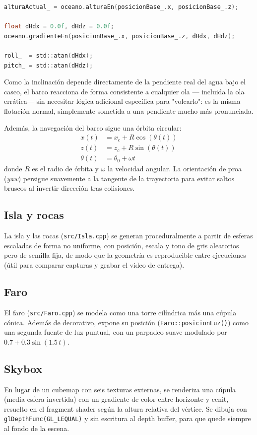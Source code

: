 \documentclass[11pt]{article}
\begin{document}
\begin{lstlisting}[language=C,caption={Barco::actualizar --- flotacion via pendiente analitica}]
alturaActual_ = oceano.alturaEn(posicionBase_.x, posicionBase_.z);

float dHdx = 0.0f, dHdz = 0.0f;
oceano.gradienteEn(posicionBase_.x, posicionBase_.z, dHdx, dHdz);

roll_  = std::atan(dHdx);
pitch_ = std::atan(dHdz);
\end{lstlisting}

Como la inclinación depende directamente de la pendiente real del agua bajo
el casco, el barco reacciona de forma consistente a cualquier ola —
incluida la ola errática— sin necesitar lógica adicional específica para
"volcarlo": es la misma flotación normal, simplemente sometida a una
pendiente mucho más pronunciada.

Además, la navegación del barco sigue una órbita circular:
\begin{align}
x(t) &= x_c + R\cos(\theta(t)) \\
z(t) &= z_c + R\sin(\theta(t)) \\
\theta(t) &= \theta_0 + \omega t
\end{align}
donde $R$ es el radio de órbita y $\omega$ la velocidad angular. La orientación
de proa (\emph{yaw}) persigue suavemente a la tangente de la trayectoria para
evitar saltos bruscos al invertir dirección tras colisiones.

\subsection{Isla y rocas}
La isla y las rocas (\texttt{src/Isla.cpp}) se generan proceduralmente a
partir de esferas escaladas de forma no uniforme, con posición, escala y
tono de gris aleatorios pero de semilla fija, de modo que la geometría es
reproducible entre ejecuciones (útil para comparar capturas y grabar el
video de entrega).

\subsection{Faro}\label{sec:faro}
El faro (\texttt{src/Faro.cpp}) se modela como una torre cilíndrica más una
cúpula cónica. Además de decorativo, expone su posición
(\texttt{Faro::posicionLuz()}) como una segunda fuente de luz puntual, con
un parpadeo suave modulado por $0.7 + 0.3\sin(1.5\,t)$.

\subsection{Skybox}
En lugar de un cubemap con seis texturas externas, se renderiza una cúpula
(media esfera invertida) con un gradiente de color entre horizonte y cenit,
resuelto en el fragment shader según la altura relativa del vértice. Se
dibuja con \texttt{glDepthFunc(GL\_LEQUAL)} y sin escritura al depth buffer,
para que quede siempre al fondo de la escena.
\end{document}
